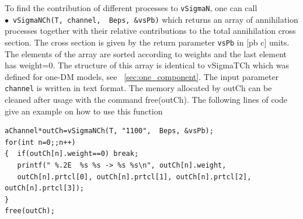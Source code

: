\documentclass[12pt,a4paper]{article}
\begin{document}
To find the contribution of  different processes to  {\tt vSigmaN},  one can call
\\

\noindent
$\bullet$~\verb|vSigmaNCh(T, channel,  Beps, &vsPb)|  which  returns an array of annihilation processes   together with their relative  contributions  to the  total annihilation  cross section.   The cross section is given by the return parameter   \verb|vsPb|  in [pb c] units. The
    elements of the array are  sorted according to weights and the last element has weight=0.  The structure of this array is
      identical to vSigmaTCh which was defined for one-DM models, see ~\ref{sec:one_component}. The input parameter  \verb|channel| is written in text format.
      The memory allocated by  outCh  can be  cleaned after usage with the command free(outCh).   
The following lines of code give an example on how to use this function \\

\begin{verbatim}
aChannel*outCh=vSigmaNCh(T, "1100",  Beps, &vsPb);
for(int n=0;;n++)
{  if(outCh[n].weight==0) break;
   printf(" %.2E  %s %s -> %s %s\n", outCh[n].weight, 
   outCh[n].prtcl[0], outCh[n].prtcl[1], outCh[n].prtcl[2], outCh[n].prtcl[3]);
}
free(outCh);
\end{verbatim}
 
\end{document}
